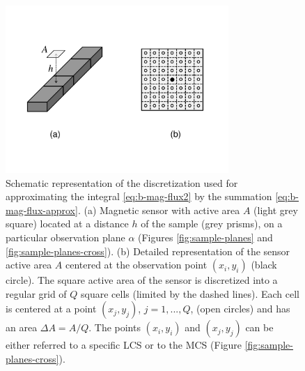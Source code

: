 \documentclass[galley,gc]{agutex}
\begin{document}
 \begin{figure}
 \noindent \includegraphics[width=20pc]{Figs/Fig4b_HQ.pdf}
 \caption{Schematic representation of the discretization
 used for approximating the integral \ref{eq:b-mag-flux2} by 
 the summation \ref{eq:b-mag-flux-approx}.
 (a) Magnetic sensor with active area $A$ (light grey square) located at
 a distance $h$ of the sample (grey prisms), on a particular observation
 plane $\alpha$ (Figures \ref{fig:sample-planes} and 
 \ref{fig:sample-planes-cross}). (b) Detailed representation
 of the sensor active area $A$ centered at the observation point
 $(x_{i}, y_{i})$ (black circle). 
 The square active area 
 of the sensor is discretized into a regular grid of $Q$ square cells 
 (limited by the dashed lines). Each cell is centered at a point 
 $(x_{j}, y_{j})$, $j = 1, ..., Q$, (open circles) and 
 has an area $\Delta A = A/Q$. The points $(x_{i}, y_{i})$
 and $(x_{j}, y_{j})$ can be either referred to a specific LCS or
 to the MCS (Figure \ref{fig:sample-planes-cross}).}
 \label{fig:b-mag-flux-approx}
 \end{figure} 
 
\end{document}
